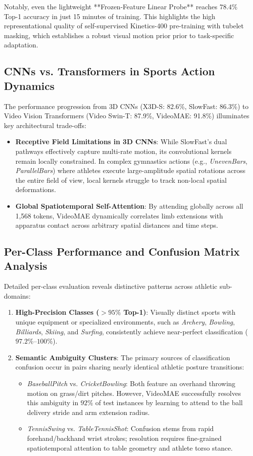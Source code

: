 Notably, even the lightweight **Frozen-Feature Linear Probe** reaches $78.4\%$ Top-1 accuracy in just 15 minutes of training. This highlights the high representational quality of self-supervised Kinetics-400 pre-training with tubelet masking, which establishes a robust visual motion prior prior to task-specific adaptation.

\subsection{CNNs vs. Transformers in Sports Action Dynamics}
The performance progression from 3D CNNs (X3D-S: 82.6\%, SlowFast: 86.3\%) to Video Vision Transformers (Video Swin-T: 87.9\%, VideoMAE: 91.8\%) illuminates key architectural trade-offs:
\begin{itemize}
    \item \textbf{Receptive Field Limitations in 3D CNNs}: While SlowFast's dual pathways effectively capture multi-rate motion, its convolutional kernels remain locally constrained. In complex gymnastics actions (e.g., \textit{UnevenBars}, \textit{ParallelBars}) where athletes execute large-amplitude spatial rotations across the entire field of view, local kernels struggle to track non-local spatial deformations.
    \item \textbf{Global Spatiotemporal Self-Attention}: By attending globally across all 1,568 tokens, VideoMAE dynamically correlates limb extensions with apparatus contact across arbitrary spatial distances and time steps.
\end{itemize}

\subsection{Per-Class Performance and Confusion Matrix Analysis}
Detailed per-class evaluation reveals distinctive patterns across athletic sub-domains:
\begin{enumerate}
    \item \textbf{High-Precision Classes ($>95\%$ Top-1)}: Visually distinct sports with unique equipment or specialized environments, such as \textit{Archery}, \textit{Bowling}, \textit{Billiards}, \textit{Skiing}, and \textit{Surfing}, consistently achieve near-perfect classification ($97.2\%$--$100\%$).
    \item \textbf{Semantic Ambiguity Clusters}: The primary sources of classification confusion occur in pairs sharing nearly identical athletic posture transitions:
    \begin{itemize}
        \item \textit{BaseballPitch} vs. \textit{CricketBowling}: Both feature an overhand throwing motion on grass/dirt pitches. However, VideoMAE successfully resolves this ambiguity in $92\%$ of test instances by learning to attend to the ball delivery stride and arm extension radius.
        \item \textit{TennisSwing} vs. \textit{TableTennisShot}: Confusion stems from rapid forehand/backhand wrist strokes; resolution requires fine-grained spatiotemporal attention to table geometry and athlete torso stance.
    \end{itemize}
\end{enumerate}

